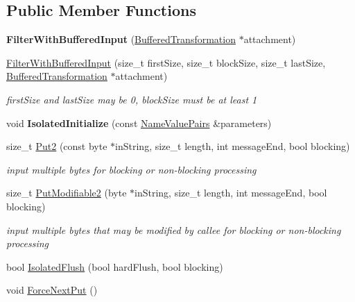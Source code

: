 \subsection*{Public Member Functions}
\begin{DoxyCompactItemize}
\item 
\hypertarget{class_filter_with_buffered_input_a8c60c4e6452fdeb61f9d888bf50a706d}{
{\bfseries FilterWithBufferedInput} (\hyperlink{class_buffered_transformation}{BufferedTransformation} $\ast$attachment)}
\label{class_filter_with_buffered_input_a8c60c4e6452fdeb61f9d888bf50a706d}

\item 
\hypertarget{class_filter_with_buffered_input_a9565e0646b6a53101f394992ca4e0d17}{
\hyperlink{class_filter_with_buffered_input_a9565e0646b6a53101f394992ca4e0d17}{FilterWithBufferedInput} (size\_\-t firstSize, size\_\-t blockSize, size\_\-t lastSize, \hyperlink{class_buffered_transformation}{BufferedTransformation} $\ast$attachment)}
\label{class_filter_with_buffered_input_a9565e0646b6a53101f394992ca4e0d17}

\begin{DoxyCompactList}\small\item\em firstSize and lastSize may be 0, blockSize must be at least 1 \item\end{DoxyCompactList}\item 
\hypertarget{class_filter_with_buffered_input_ae97be71708e0020167e5c08856fd3f3b}{
void {\bfseries IsolatedInitialize} (const \hyperlink{class_name_value_pairs}{NameValuePairs} \&parameters)}
\label{class_filter_with_buffered_input_ae97be71708e0020167e5c08856fd3f3b}

\item 
size\_\-t \hyperlink{class_filter_with_buffered_input_a9885841f5ecee1403b57c5b1fc28a928}{Put2} (const byte $\ast$inString, size\_\-t length, int messageEnd, bool blocking)
\begin{DoxyCompactList}\small\item\em input multiple bytes for blocking or non-\/blocking processing \item\end{DoxyCompactList}\item 
size\_\-t \hyperlink{class_filter_with_buffered_input_abc7a44af560a17d30a48651683e18e6e}{PutModifiable2} (byte $\ast$inString, size\_\-t length, int messageEnd, bool blocking)
\begin{DoxyCompactList}\small\item\em input multiple bytes that may be modified by callee for blocking or non-\/blocking processing \item\end{DoxyCompactList}\item 
bool \hyperlink{class_filter_with_buffered_input_a4261e0491864a31738cf53b3f9343806}{IsolatedFlush} (bool hardFlush, bool blocking)
\item 
void \hyperlink{class_filter_with_buffered_input_afa0096257c94f94c3a5938a0e826c46f}{ForceNextPut} ()
\end{DoxyCompactItemize}
